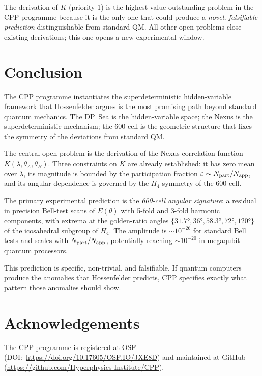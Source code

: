 \documentclass[11pt,letterpaper]{article}
\newcommand{\eps}{\varepsilon}
\begin{document}
The derivation of $K$ (priority 1) is the highest-value outstanding
problem in the CPP programme because it is the only one that could
produce a \emph{novel, falsifiable prediction} distinguishable from
standard QM.  All other open problems close existing derivations;
this one opens a new experimental window.

\section{Conclusion}

The CPP programme instantiates the superdeterministic hidden-variable
framework that Hossenfelder \citep{hossenfelder2024} argues is the
most promising path beyond standard quantum mechanics.  The DP~Sea
is the hidden-variable space; the Nexus is the superdeterministic
mechanism; the 600-cell is the geometric structure that fixes the
symmetry of the deviations from standard QM.

The central open problem is the derivation of the Nexus correlation
function $K(\lambda, \theta_A, \theta_B)$.  Three constraints on $K$
are already established: it has zero mean over $\lambda$, its
magnitude is bounded by the participation fraction
$\eps \sim N_{\rm part}/N_{\rm app}$, and its angular dependence is
governed by the $H_4$ symmetry of the 600-cell.

The primary experimental prediction is the \emph{600-cell angular
signature}: a residual in precision Bell-test scans of $E(\theta)$
with 5-fold and 3-fold harmonic components, with extrema at the
golden-ratio angles $\{31.7°, 36°, 58.3°, 72°, 120°\}$ of the
icosahedral subgroup of $H_4$.  The amplitude is $\sim 10^{-26}$
for standard Bell tests and scales with $N_{\rm part}/N_{\rm app}$,
potentially reaching $\sim 10^{-20}$ in megaqubit quantum processors.

This prediction is specific, non-trivial, and falsifiable.  If
quantum computers produce the anomalies that Hossenfelder predicts,
CPP specifies exactly what pattern those anomalies should show.





\section*{Acknowledgements}
The CPP programme is registered at OSF (DOI:~\url{https://doi.org/10.17605/OSF.IO/JXE8D}) and maintained at GitHub (\url{https://github.com/Hyperphysics-Institute/CPP}).
\end{document}
